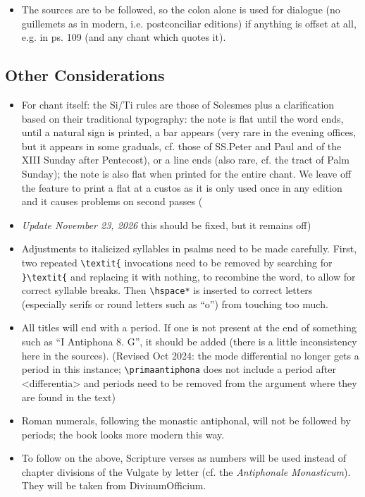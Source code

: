 \documentclass[11pt]{article}
\begin{document}
\begin{itemize}
\item
The sources are to be followed, so the colon alone is used for dialogue (no guillemets as in modern, i.e. postconciliar editions) if anything is offset at all, e.g. in ps. 109 (and any chant which quotes it).

\end{itemize}

\subsection{Other Considerations}
\begin{itemize}
\item
For chant itself: the Si/Ti rules are those of Solesmes plus a clarification based on their traditional typography: the note is flat until the word ends, until a natural sign is printed, a bar appears (very rare in the evening offices, but it appears in some graduals, cf. those of SS.\@ Peter and Paul and of the XIII Sunday after Pentecost), or a line ends (also rare, cf. the tract of Palm Sunday); the note is also flat when printed for the entire chant. We leave off the feature to print a flat at a custos as it is only used once in any edition and it causes problems on second passes (\item \emph{Update November 23, 2026} this should be fixed, but it remains off)
\item
Adjustments to italicized syllables in psalms need to be made carefully. First, two repeated \verb|\textit{| invocations need to be removed by searching for \verb|}\textit{| and replacing it with nothing, to recombine the word, to allow for correct syllable breaks. Then \verb|\hspace*| is inserted to correct letters (especially serifs or round letters such as ``o'') from touching too much.
\item
All titles will end with a period. If one is not present at the end of something such as ``I Antiphona 8. G'', it should be added (there is a little inconsistency here in the sources). (Revised Oct 2024: the mode differential no longer gets a period in this instance; \verb|\primaantiphona| does not include a period after <differentia> and periods need to be removed from the argument where they are found in the text)
\item
Roman numerals, following the monastic antiphonal, will not be followed by periods; the book looks more modern this way.
\item
To follow on the above, Scripture verses as numbers will be used instead of chapter divisions of the Vulgate by letter (cf. the \textit{Antiphonale Monasticum}). They will be taken from DivinumOfficium.

\end{itemize}
\end{document}

